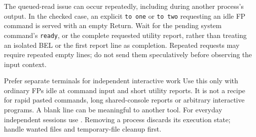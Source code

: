 The queued-read issue can occur repeatedly, including during another process's output. In the checked case, an explicit \passthrough{\lstinline!to one!} or \passthrough{\lstinline!to two!} requesting an idle FP command is served with an empty Return. Wait for the pending system command's \passthrough{\lstinline!ready!}, or the complete requested utility report, rather than treating an isolated BEL or the first report line as completion. Repeated requests may require repeated empty lines; do not send them speculatively before observing the input context.

\begin{operationnote}{Prefer separate terminals for independent interactive work}
Use this only with ordinary FPs idle at command input and short utility
reports. It is not a recipe for rapid pasted commands, long shared-console
reports or arbitrary interactive programs. A blank line can be meaningful
to another tool. For everyday independent sessions use
. Removing a process discards its execution state; handle
wanted files and temporary-file cleanup first.
\end{operationnote}
